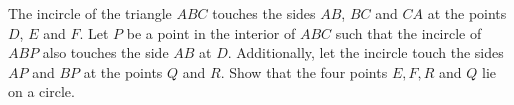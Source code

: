 The incircle of the triangle $ABC$ touches the sides $AB$, $BC$ and $CA$ at the points $D$, $E$ and $F$.
Let $P$ be a point in the interior of $ABC$ such that the incircle of $ABP$ also touches the
side $AB$ at $D$. Additionally, let the incircle touch the sides $AP$ and $BP$ at the
points $Q$ and $R$. Show that the four points $E, F, R$ and $Q$ lie on a circle.